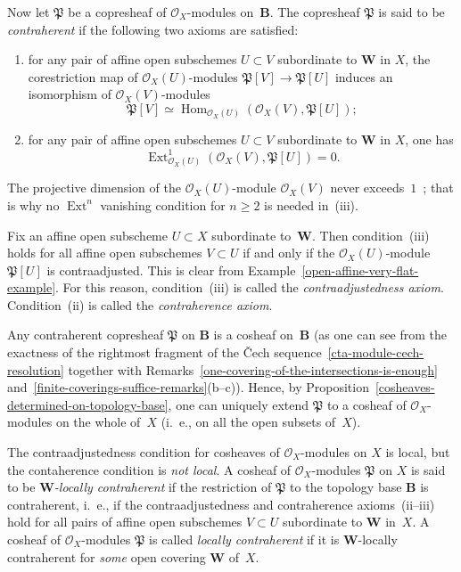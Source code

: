 \documentclass[12pt,a4paper]{amsart}
\newcommand{\+}{\nobreakdash-}
\renewcommand{\:}{\colon}
\newcommand{\rarrow}{\longrightarrow}
\DeclareMathOperator{\Hom}{Hom}
\DeclareMathOperator{\Ext}{Ext}
\newcommand{\bB}{\mathbf B}
\newcommand{\bW}{\mathbf W}
\newcommand{\cO}{\mathcal O}
\newcommand{\fP}{\mathfrak P}
\theoremstyle{plain}
\theoremstyle{definition}
\begin{document}
 Now let $\fP$ be a copresheaf of $\cO_X$\+modules on~$\bB$.
 The copresheaf $\fP$ is said to be \emph{contraherent} if
the following two axioms are satisfied:
\begin{enumerate}
\renewcommand{\theenumi}{\roman{enumi}}
\setcounter{enumi}{1}
\item for any pair of affine open subschemes $U\subset V$ subordinate
to $\bW$ in $X$, the corestriction map of $\cO_X(U)$\+modules
$\fP[V]\rarrow\fP[U]$ induces an isomorphism of $\cO_X(V)$\+modules
$$
 \fP[V]\simeq\Hom_{\cO_X(U)}(\cO_X(V),\fP[U]);
$$
\item for any pair of affine open subschemes $U\subset V$ subordinate
to $\bW$ in $X$, one has
$$
 \Ext^1_{\cO_X(U)}(\cO_X(V),\fP[U])=0.
$$
\end{enumerate}
 The projective dimension of the $\cO_X(U)$\+module $\cO_X(V)$ never
exceeds~$1$ \,\cite[Remark~5.1]{Pphil}; that is why no $\Ext^n$
vanishing condition for $n\ge2$ is needed in~(iii).

 Fix an affine open subscheme $U\subset X$ subordinate to~$\bW$.
 Then condition~(iii) holds for all affine open subschemes $V\subset U$
if and only if the $\cO_X(U)$\+module $\fP[U]$ is contraadjusted.
 This is clear from Example~\ref{open-affine-very-flat-example}.
 For this reason, condition~(iii) is called
the \emph{contraadjustedness axiom}.
 Condition~(ii) is called the \emph{contraherence axiom}.

 Any contraherent copresheaf $\fP$ on $\bB$ is a cosheaf on~$\bB$ (as
one can see from the exactness of the rightmost fragment of the \v Cech sequence~\eqref{cta-module-cech-resolution}
together with Remarks~\ref{one-covering-of-the-intersections-is-enough}
and~\ref{finite-coverings-suffice-remarks}(b\+-c)).
 Hence, by Proposition~\ref{cosheaves-determined-on-topology-base}, one
can uniquely extend $\fP$ to a cosheaf of $\cO_X$\+modules on the whole
of~$X$ (i.~e., on all the open subsets of~$X$).

 The contraadjustedness condition for cosheaves of $\cO_X$\+modules
on $X$ is local, but the contaherence condition is \emph{not local}.
 A cosheaf of $\cO_X$\+modules $\fP$ on $X$ is said to be
\emph{$\bW$\+locally contraherent} if the restriction of $\fP$ to
the topology base $\bB$ is contraherent, i.~e., if
the contraadjustedness and contraherence axioms~(ii\+-iii) hold
for all pairs of affine open subschemes $V\subset U$ subordinate
to $\bW$ in~$X$.
 A cosheaf of $\cO_X$\+modules $\fP$ is called \emph{locally
contraherent} if it is $\bW$\+locally contraherent for \emph{some}
open covering $\bW$ of~$X$.
\end{document}
